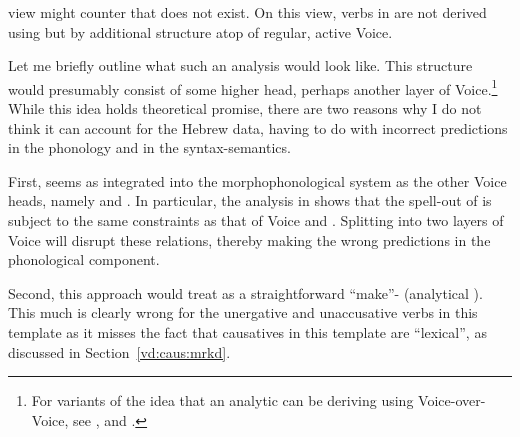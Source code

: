 \begin{exe}
\begin{xlist}
\begin{xlist}
\begin{exe}
\begin{exe}
\begin{xlist}
\begin{exe}
\begin{xlist}
\begin{exe}
\begin{xlist}
\begin{xlist}
\begin{exe}
\begin{xlist}
\begin{exe}
\begin{xlist}
\begin{exe}
\begin{exe}
\begin{exe}
\begin{xlist}
\begin{exe}
\begin{exe}
\begin{xlist}
\begin{xlist}
\begin{exe}
\begin{xlist}
\begin{exe}
\begin{exe}
\begin{exe}
\begin{xlist}
\begin{exe}
\begin{exe}
\begin{xlist}
\begin{exe}
\begin{xlist}
\begin{exe}
\begin{xlist}
\begin{exe}
\begin{xlist}
\begin{exe}
\begin{exe}
\begin{xlist}
\begin{exe}
\begin{exe}
\begin{xlist}
\begin{xlist}
\begin{exe}
\begin{xlist}
\begin{xlist}
\begin{exe}
\begin{xlist}
\begin{exe}
\begin{xlist}
\begin{exe}
\begin{xlist}
\begin{exe}
\begin{xlist}
\begin{exe}
\begin{exe}
\begin{exe}
\begin{exe}
\begin{xlist}
\begin{exe}
\begin{exe}
\begin{xlist}
\begin{xlist}
\begin{exe}
\begin{exe}
\begin{xlist}
\begin{exe}
\begin{xlist}
view might counter that {\vd} does not exist. On this view, verbs in {\thif} are not derived using {\vd} but by additional structure atop of regular, active Voice.

Let me briefly outline what such an analysis would look like. This structure would presumably consist of some higher  head, perhaps another layer of Voice.\footnote{For variants of the idea that an analytic  can be deriving using Voice-over-Voice, see \cite{tubinoblanco11}, \cite{harley13lingua,harley17oup} and \cite{nie20}.} While this idea holds theoretical promise, there are two reasons why I do not think it can account for the Hebrew data, having to do with incorrect predictions in the phonology and in the syntax-semantics.

First, {\vd} seems as integrated into the morphophonological system as the other Voice heads, namely  and {\vz}. In particular, the analysis in \cite{kastner18nllt} shows that the spell-out of {\vd} is subject to the same  constraints as that of Voice and {\vz}. Splitting {\vd} into two layers of Voice will disrupt these  relations, thereby making the wrong predictions in the phonological component.

Second, this approach would treat {\thif} as a straightforward ``make''- (analytical ). This much is clearly wrong for the unergative and unaccusative verbs in this template as it misses the fact that causatives in this template are ``lexical'', as discussed in Section~\ref{vd:caus:mrkd}. 


\end{xlist}
\end{exe}
\end{xlist}
\end{exe}
\end{exe}
\end{xlist}
\end{xlist}
\end{exe}
\end{exe}
\end{xlist}
\end{exe}
\end{exe}
\end{exe}
\end{exe}
\end{xlist}
\end{exe}
\end{xlist}
\end{exe}
\end{xlist}
\end{exe}
\end{xlist}
\end{exe}
\end{xlist}
\end{xlist}
\end{exe}
\end{xlist}
\end{xlist}
\end{exe}
\end{exe}
\end{xlist}
\end{exe}
\end{exe}
\end{xlist}
\end{exe}
\end{xlist}
\end{exe}
\end{xlist}
\end{exe}
\end{xlist}
\end{exe}
\end{exe}
\end{xlist}
\end{exe}
\end{exe}
\end{exe}
\end{xlist}
\end{exe}
\end{xlist}
\end{xlist}
\end{exe}
\end{exe}
\end{xlist}
\end{exe}
\end{exe}
\end{exe}
\end{xlist}
\end{exe}
\end{xlist}
\end{exe}
\end{xlist}
\end{xlist}
\end{exe}
\end{xlist}
\end{exe}
\end{xlist}
\end{exe}
\end{exe}
\end{xlist}
\end{xlist}
\end{exe}
